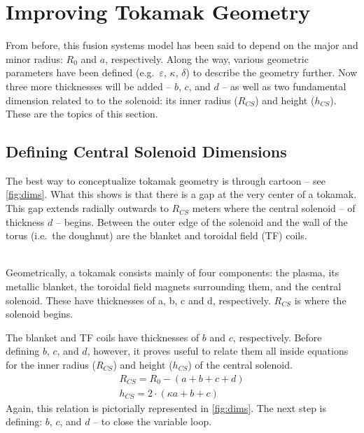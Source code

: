 \section{Improving Tokamak Geometry}

From before, this fusion systems model has been said to depend on the major and minor radius: $R_0$ and $a$, respectively. Along the way, various geometric parameters have been defined (e.g.\ $\varepsilon$, $\kappa$, $\delta$) to describe the geometry further. Now three more thicknesses will be added -- $b$, $c$, and $d$ -- as well as two fundamental dimension related to to the solenoid: its inner radius ($R_{CS}$) and height ($h_{CS}$). These are the topics of this section.

\subsection{Defining Central Solenoid Dimensions}

The best way to conceptualize tokamak geometry is through cartoon -- see \cref{fig:dims}. What this shows is that there is a gap at the very center of a tokamak. This gap extends radially outwards to $R_{CS}$ meters where the  central solenoid -- of thickness $d$ -- begins. Between the outer edge of the solenoid and the wall of the torus (i.e.\ the doughnut) are the blanket and toroidal field (TF) coils.

\begin{figure*}
\centering

\caption{Dimensions of Tokamak Cross-Section}
\label{fig:dims} ~ \\
\small{Geometrically, a tokamak consists mainly of four components: the plasma, its metallic blanket, the toroidal field magnets surrounding them, and the central solenoid. These have thicknesses of a, b, c and d, respectively. $R_{CS}$ is where the solenoid begins.}
\end{figure*}

The blanket and TF coils have thicknesses of $b$ and $c$, respectively. Before defining $b$, $c$, and $d$, however, it proves useful to relate them all inside equations for the inner radius ($R_{CS}$) and height ($h_{CS}$) of the central solenoid.
 \begin{gather}
 	\label{eq:rcs1}
 	R_{CS} = R_0 - ( a + b + c + d ) \\
	\label{eq:hcs1}
 	h_{CS} = 2 \cdot \left ( \kappa a + b + c \right)
 \end{gather}
Again, this relation is pictorially represented in \cref{fig:dims}. The next step is defining: $b$, $c$, and $d$ -- to close the variable loop.

